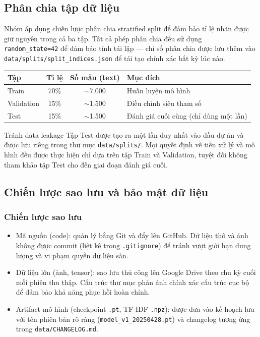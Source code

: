\subsection{Phân chia tập dữ liệu}

Nhóm áp dụng chiến lược phân chia stratified split để đảm bảo tỉ lệ nhãn được giữ nguyên trong cả ba tập. Tất cả phép phân chia đều sử dụng \texttt{random\_state=42} để đảm bảo tính tái lập --- chỉ số phân chia được lưu thêm vào \texttt{data/splits/split\_indices.json} để tái tạo chính xác bất kỳ lúc nào.

\begin{center}
\renewcommand{\arraystretch}{1.4}
\begin{tabularx}{\textwidth}{|l|c|c|X|}
\hline
\rowcolor[HTML]{E8E8E8}
\textbf{Tập} & \textbf{Tỉ lệ} & \textbf{Số mẫu (text)} & \textbf{Mục đích} \\
\hline
Train & 70\% & $\sim$7.000 & Huấn luyện mô hình \\
\hline
Validation & 15\% & $\sim$1.500 & Điều chỉnh siêu tham số \\
\hline
Test & 15\% & $\sim$1.500 & Đánh giá cuối cùng (chỉ dùng một lần) \\
\hline
\end{tabularx}
\end{center}

\begin{warningbox}{Tránh data leakage}
Tập Test được tạo ra một lần duy nhất vào đầu dự án và được lưu riêng trong thư mục \texttt{data/splits/}. Mọi quyết định về tiền xử lý và mô hình đều được thực hiện chỉ dựa trên tập Train và Validation, tuyệt đối không tham khảo tập Test cho đến giai đoạn đánh giá cuối.
\end{warningbox}

\subsection{Chiến lược sao lưu và bảo mật dữ liệu}

\subsubsection{Chiến lược sao lưu}

\begin{itemize}[labelsep=10pt, leftmargin=2cm]
    \item Mã nguồn (code): quản lý bằng Git và đẩy lên GitHub. Dữ liệu thô và ảnh không được commit (liệt kê trong \texttt{.gitignore}) để tránh vượt giới hạn dung lượng và vi phạm quyền dữ liệu sàn.
    \item Dữ liệu lớn (ảnh, tensor): sao lưu thủ công lên Google Drive theo chu kỳ cuối mỗi phiên thu thập. Cấu trúc thư mục phản ánh chính xác cấu trúc cục bộ để đảm bảo khả năng phục hồi hoàn chỉnh.
    \item Artifact mô hình (checkpoint \texttt{.pt}, TF-IDF \texttt{.npz}): được đưa vào kế hoạch lưu với tên phiên bản rõ ràng (\texttt{model\_v1\_20250428.pt}) và changelog tương ứng trong \texttt{data/CHANGELOG.md}.
\end{itemize}

